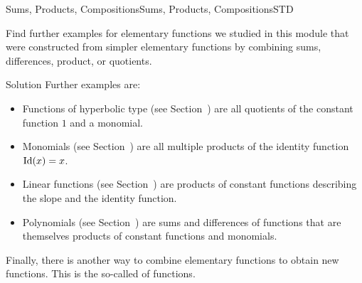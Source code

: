 \begin{MXContent}{Sums, Products, Compositions}{Sums, Products, Compositions}{STD}
\begin{MExample}
\begin{itemize}
%
\end{itemize}
 
\end{MExample}


\begin{MExercise}
Find further examples for elementary functions we studied in this module that were constructed from 
simpler elementary functions by combining sums, differences, product, or quotients. 

\begin{MHint}{Solution}
Further examples are:
\begin{itemize}
 \item Functions of hyperbolic type (see Section~) are all quotients 
  of the constant function $1$ and a monomial.
 \item Monomials (see Section~) are all multiple products of the 
  identity function $\operatorname{Id}(x)=x$.
 \item Linear functions (see Section~) are products of constant functions 
  describing the slope and the identity function.
 \item Polynomials (see Section~) are sums and differences of functions 
  that are themselves products of constant functions and monomials.
\end{itemize}
 
\end{MHint}

\end{MExercise}

Finally, there is another way to combine elementary functions to obtain new functions. This is the 
so-called  of functions. 


\end{MXContent}
